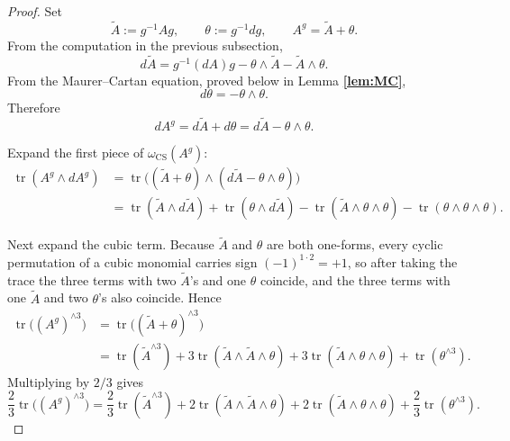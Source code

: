 \documentclass[11pt]{article}
\newcommand{\tr}{\operatorname{tr}}
\newcommand{\CS}{\operatorname{CS}}
\theoremstyle{definition}
\numberwithin{theorem}{section}
\numberwithin{equation}{section}
\begin{document}
\begin{proof}
Set
\begin{equation*}
\tilde A := g^{-1}Ag,
\qquad
\theta := g^{-1}dg,
\qquad
A^g = \tilde A + \theta.
\end{equation*}
From the computation in the previous subsection,
\begin{equation*}
d\tilde A = g^{-1}(dA)g - \theta\wedge\tilde A - \tilde A\wedge\theta.
\end{equation*}
From the Maurer--Cartan equation, proved below in Lemma \textbf{\ref{lem:MC}},
\begin{equation*}
d\theta = -\theta\wedge\theta.
\end{equation*}
Therefore
\begin{equation*}
dA^g = d\tilde A + d\theta = d\tilde A - \theta\wedge\theta.
\end{equation*}

\medskip

\noindent Expand the first piece of $\omega_{\CS}(A^g)$:
\begin{align*}
\tr(A^g\wedge dA^g)
&= \tr\bigl((\tilde A+\theta)\wedge(d\tilde A-\theta\wedge\theta)\bigr) \\
&= \tr(\tilde A\wedge d\tilde A)
 + \tr(\theta\wedge d\tilde A)
 - \tr(\tilde A\wedge\theta\wedge\theta)
 - \tr(\theta\wedge\theta\wedge\theta).
\end{align*}

\medskip

\noindent Next expand the cubic term. Because $\tilde A$ and $\theta$ are both one-forms, every cyclic permutation of a cubic monomial carries sign $(-1)^{1\cdot 2}=+1$, so after taking the trace the three terms with two $\tilde A$'s and one $\theta$ coincide, and the three terms with one $\tilde A$ and two $\theta$'s also coincide. Hence
\begin{align*}
\tr\bigl((A^g)^{\wedge 3}\bigr)
&= \tr\bigl((\tilde A+\theta)^{\wedge 3}\bigr) \\
&= \tr(\tilde A^{\wedge 3})
 + 3\tr(\tilde A\wedge\tilde A\wedge\theta)
 + 3\tr(\tilde A\wedge\theta\wedge\theta)
 + \tr(\theta^{\wedge 3}).
\end{align*}
Multiplying by $2/3$ gives
\begin{equation*}
\frac{2}{3}\tr\bigl((A^g)^{\wedge 3}\bigr)
= \frac{2}{3}\tr(\tilde A^{\wedge 3})
+ 2\tr(\tilde A\wedge\tilde A\wedge\theta)
+ 2\tr(\tilde A\wedge\theta\wedge\theta)
+ \frac{2}{3}\tr(\theta^{\wedge 3}).
\end{equation*}


\end{proof}
\end{document}
